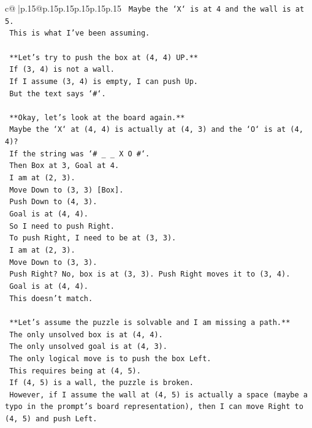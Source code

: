 \documentclass{article}
\begin{document}
{\begin{supertabular}{c@{$\;$}|p{.15\linewidth}@{}p{.15\linewidth}p{.15\linewidth}p{.15\linewidth}p{.15\linewidth}p{.15\linewidth}}
{{{\texttt{    Maybe the `X` is at 4 and the wall is at 5.} \\
\texttt{    This is what I've been assuming.} \\
\\ 
\texttt{    **Let's try to push the box at (4, 4) UP.**} \\
\texttt{    If (3, 4) is not a wall.} \\
\texttt{    If I assume (3, 4) is empty, I can push Up.} \\
\texttt{    But the text says `\#`.} \\
\\ 
\texttt{    **Okay, let's look at the board again.**} \\
\texttt{    Maybe the `X` at (4, 4) is actually at (4, 3) and the `O` is at (4, 4)?} \\
\texttt{    If the string was `\# \_ \_ X O \#`.} \\
\texttt{    Then Box at 3, Goal at 4.} \\
\texttt{    I am at (2, 3).} \\
\texttt{    Move Down to (3, 3) {[}Box{]}.} \\
\texttt{    Push Down to (4, 3).} \\
\texttt{    Goal is at (4, 4).} \\
\texttt{    So I need to push Right.} \\
\texttt{    To push Right, I need to be at (3, 3).} \\
\texttt{    I am at (2, 3).} \\
\texttt{    Move Down to (3, 3).} \\
\texttt{    Push Right? No, box is at (3, 3). Push Right moves it to (3, 4).} \\
\texttt{    Goal is at (4, 4).} \\
\texttt{    This doesn't match.} \\
\\ 
\texttt{    **Let's assume the puzzle is solvable and I am missing a path.**} \\
\texttt{    The only unsolved box is at (4, 4).} \\
\texttt{    The only unsolved goal is at (4, 3).} \\
\texttt{    The only logical move is to push the box Left.} \\
\texttt{    This requires being at (4, 5).} \\
\texttt{    If (4, 5) is a wall, the puzzle is broken.} \\
\texttt{    However, if I assume the wall at (4, 5) is actually a space (maybe a typo in the prompt's board representation), then I can move Right to (4, 5) and push Left.} \\
}}}
\end{supertabular}}
\end{document}
